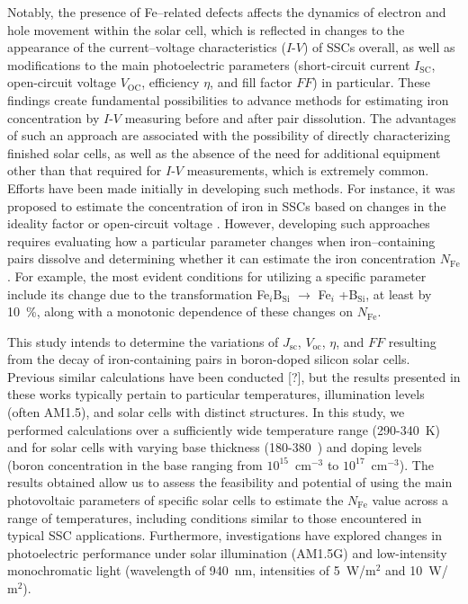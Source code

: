 \documentclass[a4paper,fleqn]{cas-sc}
\begin{document}
Notably, the presence of Fe--related defects affects the dynamics of electron and hole movement within the solar cell, 
which is reflected in changes to the appearance of the current--voltage characteristics ($I$-$V$) of SSCs overall, 
as well as modifications to the main photoelectric parameters 
(short-circuit current  $I_\mathrm{SC}$, 
open-circuit voltage $V_\mathrm{OC}$, 
efficiency $\eta$, and fill factor $FF$) 
in particular. 
These findings create fundamental possibilities to advance methods for estimating iron concentration by $I$-$V$ measuring before and after pair dissolution. 
The advantages of such an approach are associated with the possibility of directly characterizing finished solar cells, 
as well as the absence of the need for additional equipment other than that required for $I$-$V$ measurements, which is extremely common. 
Efforts have been made initially in developing such methods. 
For instance, it was proposed to estimate the concentration of iron in SSCs based on changes in the ideality factor \cite{Olikh2019,Olikh2022PPV}
or open-circuit voltage \cite{Herguth2022}. 
However, developing such approaches requires evaluating how a particular parameter changes when iron--containing pairs dissolve 
and determining whether it can estimate the iron concentration $N_\mathrm{Fe}$. 
For example, the most evident conditions for utilizing a specific parameter include its change due to the transformation  
Fe$_i$B$_\mathrm{Si}$ $\rightarrow$ Fe$_i$ +B$_\mathrm{Si}$,
at least by 10~\%, along with a monotonic dependence of these changes on $N_\mathrm{Fe}$.


This study intends to determine the variations of $J$$\mathrm{_{sc}}$, $V$$\mathrm{_{oc}}$, $\eta$, and $FF$ resulting from the decay of iron-containing pairs in boron-doped silicon solar cells. Previous similar calculations have been conducted [?], but the results presented in these works typically pertain to particular temperatures, illumination levels (often AM1.5), and solar cells with distinct structures. In this study, we performed calculations over a sufficiently wide temperature range (290-340~$\mathrm{K}$) and for solar cells with varying base thickness (180-380~\textnormal{\textmu}) and doping levels (boron concentration in the base ranging from $\mathrm{10}^{15}$~$\mathrm{cm}^{-3}$ to $\mathrm{10}^{17}$~$\mathrm{cm}^{-3}$). The results obtained allow us to assess the feasibility and potential of using the main photovoltaic parameters of specific solar cells to estimate the $N$$\mathrm{_{Fe}}$ value across a range of temperatures, including conditions similar to those encountered in typical SSC applications. Furthermore, investigations have explored changes in photoelectric performance under solar illumination (AM1.5G) and low-intensity monochromatic light (wavelength of 940~$\mathrm{nm}$, intensities of 5~W/$\mathrm{m}^{2}$ and 10~W/$\mathrm{m}^{2}$).
\end{document}
